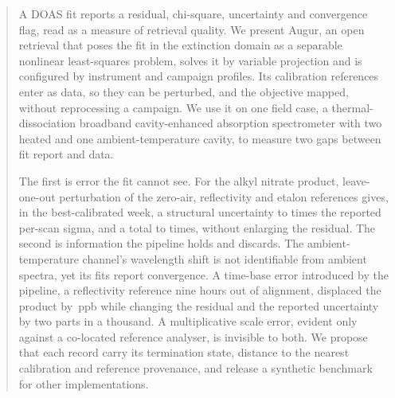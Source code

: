 \begin{abstract}
A DOAS fit reports a residual, chi-square, uncertainty and convergence flag, read as a measure of retrieval
quality. We present Augur, an open retrieval that poses the fit in the extinction domain as a
separable nonlinear least-squares problem, solves it by variable projection and is configured by instrument and
campaign profiles. Its calibration references enter as data, so they can be perturbed, and the objective mapped, without
reprocessing a campaign. We use it on one field case, a
thermal-dissociation broadband cavity-enhanced absorption spectrometer \citep{Min_2016,Nam_2022} with two heated and one
ambient-temperature cavity, to measure two gaps between fit report and data.

The first is error the fit cannot see. For the alkyl nitrate product, leave-one-out perturbation of the zero-air,
reflectivity and etalon references gives, in the best-calibrated week, a structural uncertainty  to 
times the reported per-scan sigma, and a total  to  times, without enlarging the residual. The second is information the pipeline holds and
discards. The ambient-temperature channel's wavelength shift is not identifiable from ambient spectra, yet its fits
report convergence. A time-base error introduced by the pipeline, a reflectivity reference nine
hours out of alignment, displaced the product by \,ppb while changing the residual and the reported uncertainty
by two parts in a thousand. A multiplicative scale error, evident only against a co-located reference analyser, is invisible to both.
We propose that each record carry its termination state, distance to the nearest calibration and reference
provenance, and release a synthetic benchmark for other implementations.
\end{abstract}
